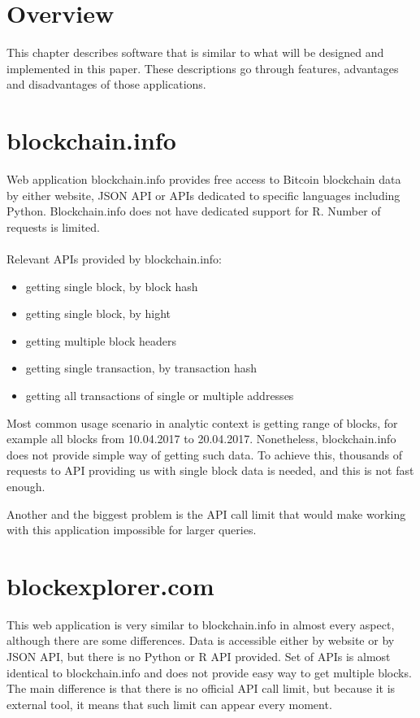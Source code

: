 \documentclass[12pt, en, eng, oneside, final]{mgr}
\begin{document}
\section{Overview}
This chapter describes software that is similar to what will be designed and implemented in this paper. These descriptions go through features, advantages and disadvantages of those applications. 

\section{blockchain.info}

Web application blockchain.info \cite{blokchain.info} provides free access to Bitcoin blockchain data by either website, JSON API or APIs dedicated to specific languages including Python. Blockchain.info does not have dedicated support for R. Number of requests is limited.
\\
\\
Relevant APIs provided by blockchain.info:
\begin{itemize}
\item
getting single block, by block hash
\item
getting single block, by hight
\item
getting multiple block headers
\item
getting single transaction, by transaction hash
\item
getting all transactions of single or multiple addresses


\end{itemize}

Most common usage scenario in analytic context is getting range of blocks, for example all blocks from 10.04.2017 to 20.04.2017. Nonetheless, blockchain.info does not provide simple way of getting such data. To achieve this, thousands of requests to API providing us with single block data is needed, and this is not fast enough.

Another and the biggest problem is the API call limit that would make working with this application impossible for larger queries.

\section{blockexplorer.com}

This web application\cite{blockexpolrer} is very similar to blockchain.info in almost every aspect, although there are some differences. Data is accessible either by website or by JSON API, but there is no Python or R API provided. Set of APIs is almost identical to blockchain.info and does not provide easy way to get multiple blocks. The main difference is that there is no official API call limit, but because it is external tool, it means that such limit can appear every moment.
\end{document}
